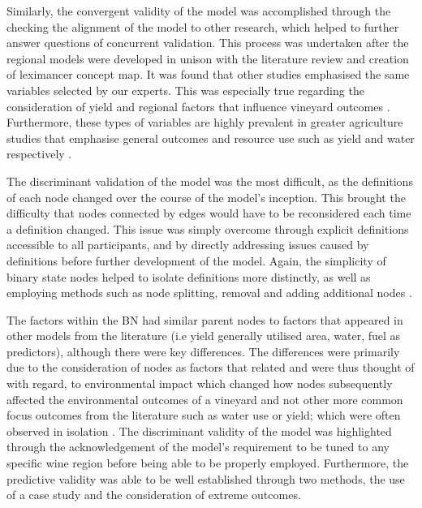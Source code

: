 \documentclass[fleqn,10pt]{wlscirep}
\begin{document}
Similarly, the convergent validity of the model was accomplished through the checking the alignment of the model to other research, which helped to further answer questions of concurrent validation. This process was undertaken after the regional models were developed in unison with the literature review and creation of leximancer concept map. It was found that other studies emphasised the same variables selected by our experts. This was especially true regarding the consideration of yield and regional factors that influence vineyard outcomes . Furthermore, these types of variables are highly prevalent in greater agriculture studies that emphasise general outcomes and resource use such as yield and water respectively .

The discriminant validation of the model was the most difficult, as the definitions of each node changed over the course of the model's inception. This brought the difficulty that nodes connected by edges would have to be reconsidered each time a definition changed. This issue was simply overcome through explicit definitions accessible to all participants, and by directly addressing issues caused by definitions before further development of the model. Again, the simplicity of binary state nodes helped to isolate definitions more distinctly, as well as employing methods such as node splitting, removal and adding additional nodes .

The factors within the BN had similar parent nodes to factors that appeared in other models from the literature (i.e yield generally utilised area, water, fuel as predictors), although there were key differences. The differences were primarily due to the consideration of nodes as factors that related and were thus thought of with regard, to environmental impact which changed how nodes subsequently affected the environmental outcomes of a vineyard and not other more common focus outcomes from the literature such as water use or yield; which were often observed in isolation . The discriminant validity of the model was highlighted through the acknowledgement of the model's requirement to be tuned to any specific wine region before being able to be properly employed. Furthermore, the predictive validity was able to be well established through two methods, the use of a case study and the consideration of extreme outcomes.
\end{document}
